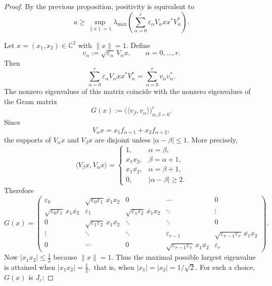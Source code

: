 \documentclass[12pt,a4paper]{amsart}
\theoremstyle{plain}
\theoremstyle{remark}
\theoremstyle{definition}
\begin{document}
\begin{proof}
	By the previous proposition, positivity is equivalent to
	\[
	a\ge \sup_{\|x\|=1}
	\lambda_{\max}\!\left(\sum_{\alpha=0}^{r}\varepsilon_\alpha V_\alpha xx^*V_\alpha^*\right).
	\]
	
	Let $x=(x_1,x_2)\in\mathbb C^2$ with $\|x\|=1$. Define
	\[
	v_\alpha:=\sqrt{\varepsilon_\alpha}\,V_\alpha x,\qquad \alpha=0,\dots,r.
	\]
	Then
	\[
	\sum_{\alpha=0}^{r}\varepsilon_\alpha V_\alpha xx^*V_\alpha^*
	=
	\sum_{\alpha=0}^{r} v_\alpha v_\alpha^*.
	\]
	The nonzero eigenvalues of this matrix coincide with the nonzero eigenvalues of the Gram matrix
	\[
	G(x):=\bigl(\langle v_\beta,v_\alpha\rangle\bigr)_{\alpha,\beta=0}^{r}.
	\]
	Since
	\[
	V_\alpha x=x_1f_{\alpha+1}+x_2f_{\alpha+2},
	\]
	the supports of $V_\alpha x$ and $V_\beta x$ are disjoint unless $|\alpha-\beta|\le 1$. More precisely,
	\[
	\langle V_\beta x,V_\alpha x\rangle=
	\begin{cases}
		1,& \alpha=\beta,\\[1mm]
		\overline{x_1}x_2,& \beta=\alpha+1,\\[1mm]
		x_1\overline{x_2},& \alpha=\beta+1,\\[1mm]
		0,& |\alpha-\beta|\ge 2.
	\end{cases}
	\]
	Therefore
	\[
	G(x)=
	\begin{pmatrix}
		\varepsilon_0 & \sqrt{\varepsilon_0\varepsilon_1}\,\overline{x_1}x_2 & 0 & \cdots & 0\\
		\sqrt{\varepsilon_0\varepsilon_1}\,x_1\overline{x_2} & \varepsilon_1 &
		\sqrt{\varepsilon_1\varepsilon_2}\,\overline{x_1}x_2 & \ddots & \vdots\\
		0 & \sqrt{\varepsilon_1\varepsilon_2}\,x_1\overline{x_2} & \ddots & \ddots & 0\\
		\vdots & \ddots & \ddots & \varepsilon_{r-1} &
		\sqrt{\varepsilon_{r-1}\varepsilon_r}\,\overline{x_1}x_2\\
		0 & \cdots & 0 & \sqrt{\varepsilon_{r-1}\varepsilon_r}\,x_1\overline{x_2} & \varepsilon_r
	\end{pmatrix}.
	\]
	Now $ |x_1x_2|\le \frac12 $ 
	because $\|x\|=1$. 
	Thus the maximal possible largest eigenvalue is attained when
$|x_1x_2|=\frac12,$
	that is, when $|x_1|=|x_2|=1/\sqrt2$. For such a choice, $G(x)$ is $J_\varepsilon$:%

\end{proof}
\end{document}
